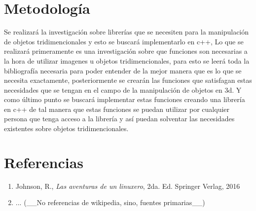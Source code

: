 \documentclass[letterpaper]{article}
\begin{document}
\section{Metodología}

Se realizará la investigación sobre librerías que se necesiten para la manipulación de objetos tridimencionales y esto se buscará implementarlo en c++, Lo que se realizará primeramente es una investigación sobre que funciones son necesarias a la hora de utilizar imagenes u objetos tridimencionales, para esto se leerá toda la bibliografía necesaria para poder entender de la mejor manera que es lo que se necesita exactamente, posteriormente se crearán las funciones que satisfagan estas necesidades que se tengan en el campo de la manipulación de objetos en 3d. Y como último punto se buscará implementar estas funciones creando una librería en c++ de tal manera que estas funciones se puedan utilizar por cualquier persona que tenga acceso a la librería y así puedan solventar las necesidades existentes sobre objetos tridimencionales.\\



\section{Referencias}

\begin{enumerate}
\item Johnson, R., \textit{Las aventuras de un linuxero}, 2da. Ed. Springer Verlag, 2016
\item ... (\_\_No referencias de wikipedia, sino, fuentes primarias\_\_)
\end{enumerate}
	
\end{document}
